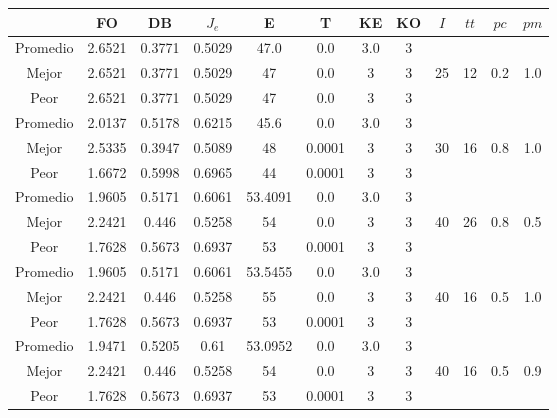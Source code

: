 \begin{table}[h!]
    \footnotesize
    \begin{center}
        \begin{tabular}{|c|c|c|c|c|c|c|c|c|c|c|c|}
        \hline
            & {\bf FO} & {\bf DB} & $J_e$ & {\bf E} & {\bf T} & {\bf KE} & {\bf KO} & $I$ & $tt$ & $pc$ & $pm$ \\
        \hline
        \hline
            Promedio  & 2.6521 & 0.3771 & 0.5029 & 47.0 & 0.0 & 3.0 & 3 &  &  &  & \\
            \cline{1-8}
            Mejor & 2.6521 & 0.3771  & 0.5029 & 47 & 0.0 & 3 & 3 & 25 & 12 & 0.2 & 1.0\\
            \cline{1-8}
            Peor & 2.6521 & 0.3771  & 0.5029 & 47 & 0.0 & 3 & 3 &  &  &  & \\
        \hline
        \hline
            Promedio  & 2.0137 & 0.5178 & 0.6215 & 45.6 & 0.0 & 3.0 & 3 &  &  &  & \\
            \cline{1-8}
            Mejor & 2.5335 & 0.3947  & 0.5089 & 48 & 0.0001 & 3 & 3 & 30 & 16 & 0.8 & 1.0\\
            \cline{1-8}
            Peor & 1.6672 & 0.5998  & 0.6965 & 44 & 0.0001 & 3 & 3 &  &  &  & \\
        \hline
        \hline
            Promedio  & 1.9605 & 0.5171 & 0.6061 & 53.4091 & 0.0 & 3.0 & 3 &  &  &  & \\
            \cline{1-8}
            Mejor & 2.2421 & 0.446  & 0.5258 & 54 & 0.0 & 3 & 3 & 40 & 26 & 0.8 & 0.5\\
            \cline{1-8}
            Peor & 1.7628 & 0.5673  & 0.6937 & 53 & 0.0001 & 3 & 3 &  &  &  & \\
        \hline
        \hline
            Promedio  & 1.9605 & 0.5171 & 0.6061 & 53.5455 & 0.0 & 3.0 & 3 &  &  &  & \\
            \cline{1-8}
            Mejor & 2.2421 & 0.446  & 0.5258 & 55 & 0.0 & 3 & 3 & 40 & 16 & 0.5 & 1.0\\
            \cline{1-8}
            Peor & 1.7628 & 0.5673  & 0.6937 & 53 & 0.0001 & 3 & 3 &  &  &  & \\
        \hline
        \hline
            Promedio  & 1.9471 & 0.5205 & 0.61 & 53.0952 & 0.0 & 3.0 & 3 &  &  &  & \\
            \cline{1-8}
            Mejor & 2.2421 & 0.446  & 0.5258 & 54 & 0.0 & 3 & 3 & 40 & 16 & 0.5 & 0.9\\
            \cline{1-8}
            Peor & 1.7628 & 0.5673  & 0.6937 & 53 & 0.0001 & 3 & 3 &  &  &  & \\

\end{tabular}
\end{center}
\end{table}
